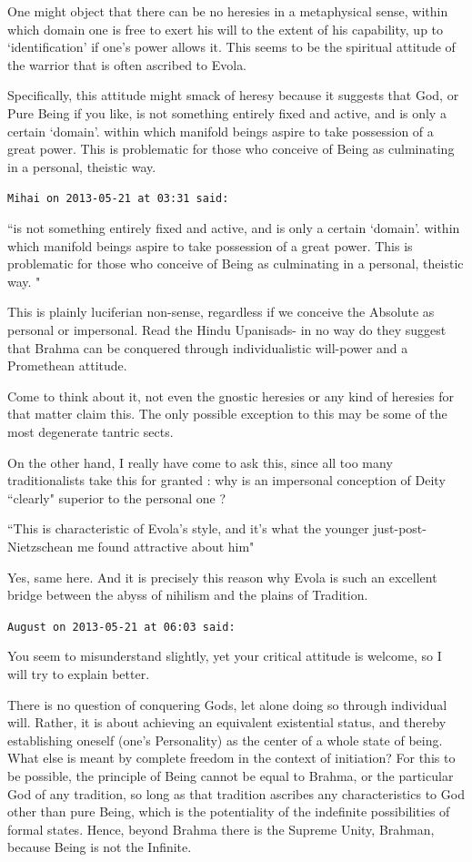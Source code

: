 \begin{footnotesize}
\begin{sffamily}
One might object that there can be no heresies in a metaphysical sense, within which domain one is free to exert his will to the extent of his capability, up to `identification' if one's power allows it. This seems to be the spiritual attitude of the warrior that is often ascribed to Evola.

Specifically, this attitude might smack of heresy because it suggests that God, or Pure Being if you like, is not something entirely fixed and active, and is only a certain `domain'. within which manifold beings aspire to take possession of a great power. This is problematic for those who conceive of Being as culminating in a personal, theistic way.


\hfill


\texttt{Mihai on 2013-05-21 at 03:31 said: }

``is not something entirely fixed and active, and is only a certain `domain'. within which manifold beings aspire to take possession of a great power. This is problematic for those who conceive of Being as culminating in a personal, theistic way. "

This is plainly luciferian non-sense, regardless if we conceive the Absolute as personal or impersonal. Read the Hindu Upanisads- in no way do they suggest that Brahma can be conquered through individualistic will-power and a Promethean attitude.

Come to think about it, not even the gnostic heresies or any kind of heresies for that matter claim this. The only possible exception to this may be some of the most degenerate tantric sects. 

On the other hand, I really have come to ask this, since all too many traditionalists take this for granted : why is an impersonal conception of Deity ``clearly" superior to the personal one ?

``This is characteristic of Evola's style, and it's what the younger just-post-Nietzschean me found attractive about him"

Yes, same here. And it is precisely this reason why Evola is such an excellent bridge between the abyss of nihilism and the plains of Tradition.


\hfill

\texttt{August on 2013-05-21 at 06:03 said: }

You seem to misunderstand slightly, yet your critical attitude is welcome, so I will try to explain better.

There is no question of conquering Gods, let alone doing so through individual will. Rather, it is about achieving an equivalent existential status, and thereby establishing oneself (one's Personality) as the center of a whole state of being. What else is meant by complete freedom in the context of initiation? For this to be possible, the principle of Being cannot be equal to Brahma, or the particular God of any tradition, so long as that tradition ascribes any characteristics to God other than pure Being, which is the potentiality of the indefinite possibilities of formal states. Hence, beyond Brahma there is the Supreme Unity, Brahman, because Being is not the Infinite.


\end{sffamily}
\end{footnotesize}
